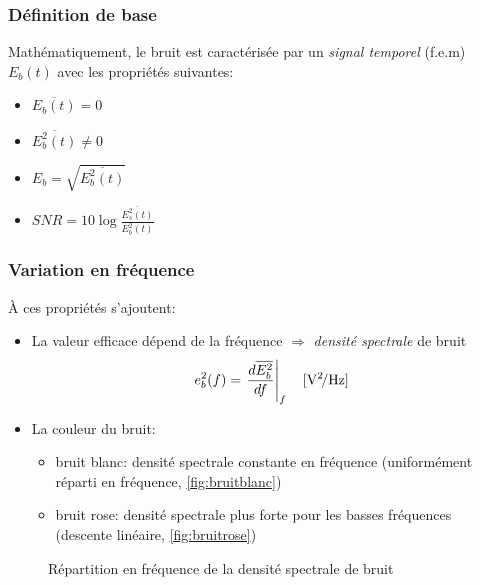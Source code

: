 \subsubsection{Définition de base}
Mathématiquement, le bruit est caractérisée par un \emph{signal temporel} (f.e.m) \(E_b(t)\) avec les propriétés suivantes:
\begin{itemize}
	\item { \(\overline{E_b(t)}=0\)}
	\item { \(\overline{E_b^2(t)} \neq 0\)}
	\item { \(E_b=\sqrt{\overline{E_b^2(t)}}\)}
	\item { \(SNR=10\log\frac{\overline{E^2_s(t)}}{E_b^2(t)}\)}
\end{itemize}
\subsubsection{Variation en fréquence}
À ces propriétés s'ajoutent:\begin{itemize}
	\item La valeur efficace dépend de la fréquence \(\Rightarrow\) \emph{densité spectrale} de bruit \[e_b^2(f)=\left.\frac{d\overline{E_b^2}}{df}\right|_f\quad [\si[per-mode=symbol]{\volt\squared\per\hertz}]\]
	\item La couleur du bruit:
	\begin{itemize}
		\item bruit blanc: densité spectrale constante en fréquence (uniformément réparti en fréquence, \autoref{fig:bruitblanc})
		\item bruit rose: densité spectrale plus forte pour les basses fréquences (descente linéaire, \autoref{fig:bruitrose})
	\end{itemize}
\end{itemize}
\begin{figure}[H]
	\centering
	\caption{Répartition en fréquence de la densité spectrale de bruit}
\end{figure}
